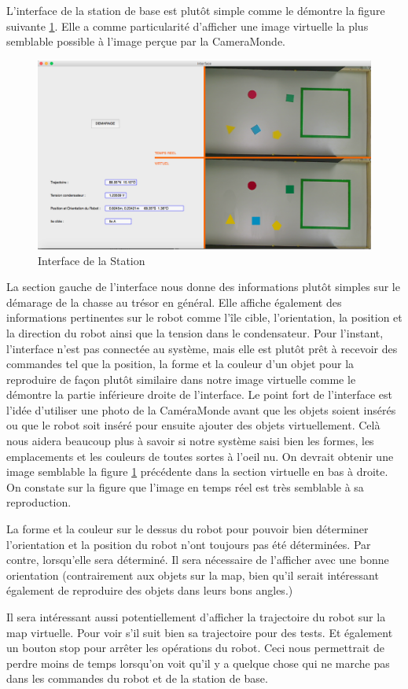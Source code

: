 \documentclass[10pt]{article}
\begin{document}
L'interface de la station de base est plutôt simple comme le démontre la figure suivante \ref{f:InterfaceImage}. Elle a comme particularité d'afficher une image virtuelle la plus semblable possible à l'image perçue par la CameraMonde.
\medbreak

\begin{figure}[htp]
   \centering
   \includegraphics[width=1\textwidth]{fig/interface_Image.png}
   \caption{Interface de la Station}
   \label{f:InterfaceImage}
\end{figure}

\medbreak
La section gauche de l'interface nous donne des informations plutôt simples sur le démarage de la chasse au trésor en général. Elle affiche également des informations pertinentes sur le robot comme l'île cible, l'orientation, la position et la direction du robot ainsi que la tension dans le condensateur.
\medbreak
Pour l'instant, l'interface n'est pas connectée au système, mais elle est plutôt prêt à recevoir des commandes tel que la position, la forme et la couleur d'un objet pour la reproduire de façon plutôt similaire dans notre image virtuelle comme le démontre la partie inférieure droite de l'interface.
\medbreak
Le point fort de l'interface est l'idée d'utiliser une photo de la CaméraMonde avant que les objets soient insérés ou que le robot soit inséré pour ensuite ajouter des objets virtuellement. Celà nous aidera beaucoup plus à savoir si notre système saisi bien les formes, les emplacements et les couleurs de toutes sortes à l'oeil nu. On devrait obtenir une image semblable la figure \ref{f:InterfaceImage} précédente dans la section virtuelle en bas à droite. On constate sur la figure que l'image en temps réel est très semblable à sa reproduction.

La forme et la couleur sur le dessus du robot pour pouvoir bien déterminer l'orientation et la position du robot n'ont toujours pas été déterminées. Par contre, lorsqu'elle sera déterminé. Il sera nécessaire de l'afficher avec une bonne orientation (contrairement aux objets sur la map, bien qu'il serait intéressant également de reproduire des objets dans leurs bons angles.)
\medbreak

 Il sera intéressant aussi potentiellement d'afficher la trajectoire du robot sur la map virtuelle. Pour voir s'il suit bien sa trajectoire pour des tests. Et également un bouton stop pour arrêter les opérations du robot. Ceci nous permettrait de perdre moins de temps lorsqu'on voit qu'il y a quelque chose qui ne marche pas dans les commandes du robot et de la station de base.
\end{document}
